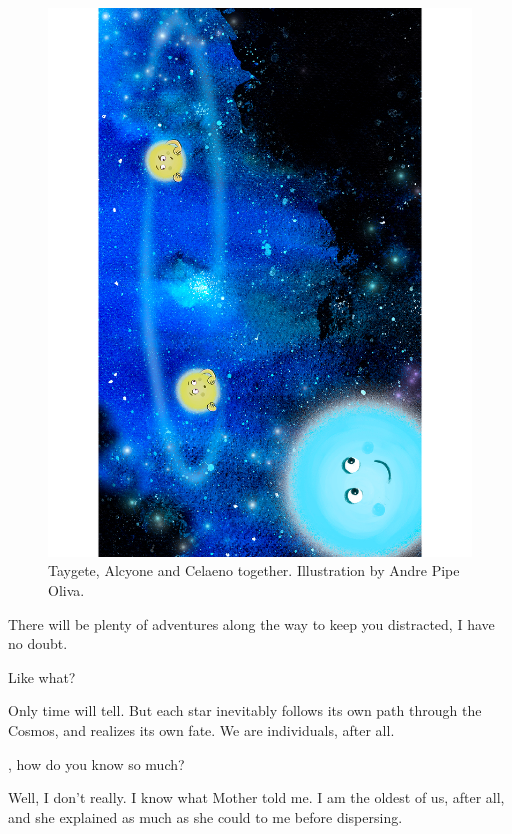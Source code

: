 \documentclass[main.tex]{subfiles}
\begin{document}
\begin{figure}
\includegraphics[width=\columnwidth,angle=270,origin=c]{ch1_2.pdf}
\caption{Taygete, Alcyone and Celaeno together.  Illustration by Andre Pipe Oliva.
\label{fig:fig2}}
\end{figure}

\par \Maia There will be plenty of adventures along the way to keep you distracted, I have no doubt.

\par \Sterope  Like what?  

\par \Maia Only time will tell.  But each star inevitably follows its own path through the Cosmos, and realizes its own fate.  We are individuals, after all.

\par \Sterope \rmmaia, how do you know so much?

\par \Maia Well, I don't really. I know what Mother told me.  I am the oldest of us, after all, and she explained as much as she could to me before dispersing.  
\end{document}
